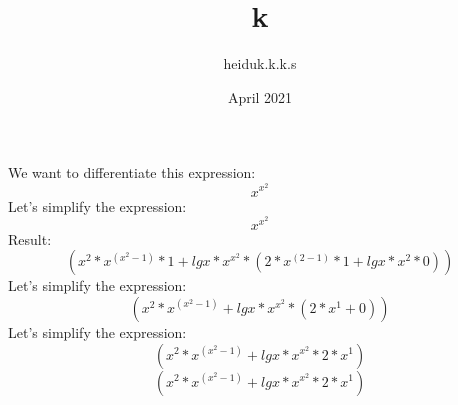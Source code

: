 \documentclass{article}
\title{k}
\author{heiduk.k.k.s }
\date{April 2021}
\begin{document}
\maketitle
\centering
We want to differentiate this expression:
$$ x^{x^{2}}$$
\centering
Let's simplify the expression:
$$ x^{x^{2}}$$
\centering
Result:
$$ (x^{2}*x^{(x^{2}-1)}*1+lgx*x^{x^{2}}*(2*x^{(2-1)}*1+lgx*x^{2}*0))$$
\centering
Let's simplify the expression:
$$ (x^{2}*x^{(x^{2}-1)}+lgx*x^{x^{2}}*(2*x^{1}+0))$$
\centering
Let's simplify the expression:
$$ (x^{2}*x^{(x^{2}-1)}+lgx*x^{x^{2}}*2*x^{1})$$
$$ (x^{2}*x^{(x^{2}-1)}+lgx*x^{x^{2}}*2*x^{1})$$
\end{document}
